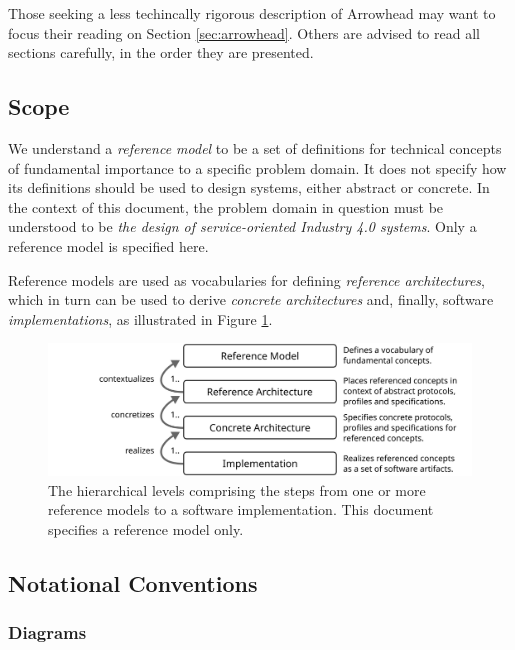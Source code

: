 Those seeking a less techincally rigorous description of Arrowhead may want to focus their reading on Section \ref{sec:arrowhead}.
Others are advised to read all sections carefully, in the order they are presented.

\subsection{Scope}
\label{sec:introduction:scope}

We understand a \textit{reference model} to be a set of definitions for technical concepts of fundamental importance to a specific problem domain.
It does not specify how its definitions should be used to design systems, either abstract or concrete.
In the context of this document, the problem domain in question must be understood to be \textit{the design of service-oriented Industry 4.0 systems}.
Only a reference model is specified here.

Reference models are used as vocabularies for defining \textit{reference architectures}, which in turn can be used to derive \textit{concrete architectures} and, finally, software \textit{implementations}, as illustrated in Figure \ref{fig:model-implementation-hierarchy}.

\begin{figure}[ht]
  \centering
  \includegraphics{figures/model-implementation-hierarchy}
  \caption{
    The hierarchical levels comprising the steps from one or more reference models to a software implementation.
    This document specifies a reference model only.
  }
  \label{fig:model-implementation-hierarchy}
\end{figure}

\subsection{Notational Conventions}
\label{sec:introduction:conventions}

\subsubsection{Diagrams}


